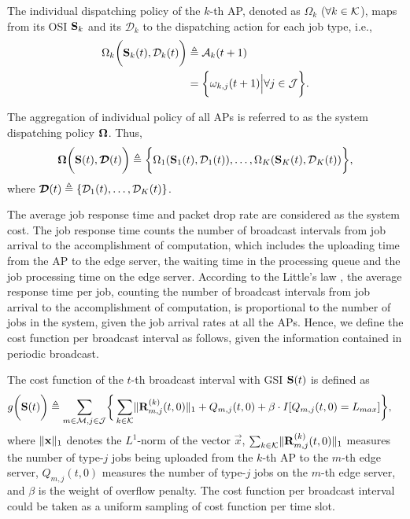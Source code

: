\begin{definition}
    The individual dispatching policy of the $k$-th AP, denoted as $\Omega_{k}$ ($\forall k \in\mathcal{K}$), maps from its OSI $\mathbf{S}_{k}$ and its {\brlatency} $\mathcal{D}_{k}$ to the dispatching action for each job type, i.e.,
    \begin{align}
        \Omega_{k} \bigg( \mathbf{S}_{k}(t), \mathcal{D}_{k}(t) \bigg)
        &\triangleq \mathcal{A}_{k}(t+1)
        \nonumber\\
        &= \bigg\{
            \omega_{k,j}(t+1) \Big| \forall j\in\mathcal{J}
        \bigg\}.
        \label{def:action}
    \end{align}

    The aggregation of individual policy of all APs is referred to as the system dispatching policy $\boldsymbol{\Omega}$.
    Thus,
    \begin{align}
        \boldsymbol{\Omega}\bigg( \mathbf{S}(t), \boldsymbol{\mathcal{D}}(t) \bigg) \triangleq \bigg\{
            \Omega_{1}(\mathbf{S}_{1}(t), \mathcal{D}_{1}(t)), \dots, \Omega_{K}(\mathbf{S}_{K}(t),\mathcal{D}_{K}(t))
        \bigg\},
    \end{align}
    where $\boldsymbol{\mathcal{D}}(t) \triangleq \{ \mathcal{D}_{1}(t), \dots, \mathcal{D}_{K}(t) \}$.
\end{definition}

The average job response time and packet drop rate are considered as the system cost.
The job response time counts the number of broadcast intervals from job arrival to the accomplishment of computation, which includes the uploading time from the AP to the edge server, the waiting time in the processing queue and the job processing time on the edge server.
According to the Little's law \cite{Little1961}, the average response time per job, counting the number of broadcast intervals from job arrival to the accomplishment of computation, is proportional to the number of jobs in the system, given the job arrival rates at all the APs.
Hence, we define the cost function per broadcast interval as follows, {given the information contained in periodic broadcast.}

\begin{definition}
    The cost function of the $t$-th broadcast interval with GSI $\mathbf{S}(t)$ is defined as
    \begin{align}
        g\Paren{\Stat(t)} \define
            \sum_{m\in\esSet,j\in\jSpace}
            \Brace{&
                \sum_{k\in\apSet} \Inorm{\vec{R}^{(k)}_{m,j}(t,0)} + Q_{m,j}(t,0)
                + \beta \cdot I[Q_{m,j}(t,0)=L_{max}]
            },
    \end{align}
    where $\lVert\mathbf{x}\|_1$ denotes the $L^1$-norm of the vector $\vec{x}$, $\sum_{k\in\mathcal{K}} \lVert\mathbf{R}^{(k)}_{m,j}(t,0)\|_1$ measures the number of type-$j$ jobs being uploaded from the $k$-th AP to the $m$-th edge server, $Q_{m,j}(t,0)$ measures the number of type-$j$ jobs on the $m$-th edge server, and $\beta$ is the weight of overflow penalty.
    The cost function per broadcast interval could be taken as a uniform sampling of cost function per time slot.
\end{definition}

